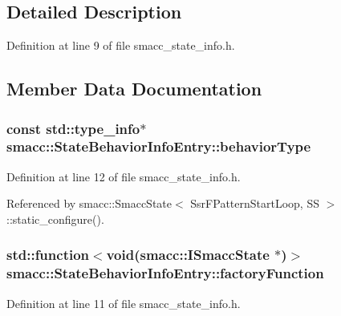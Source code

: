 \subsection{Detailed Description}


Definition at line 9 of file smacc\+\_\+state\+\_\+info.\+h.



\subsection{Member Data Documentation}
\subsubsection[{\texorpdfstring{behavior\+Type}{behaviorType}}]{\setlength{\rightskip}{0pt plus 5cm}const std\+::type\+\_\+info$\ast$ smacc\+::\+State\+Behavior\+Info\+Entry\+::behavior\+Type}\hypertarget{structsmacc_1_1StateBehaviorInfoEntry_a9f77a396b80171e010b3c30778b2f3f0}{}\label{structsmacc_1_1StateBehaviorInfoEntry_a9f77a396b80171e010b3c30778b2f3f0}


Definition at line 12 of file smacc\+\_\+state\+\_\+info.\+h.



Referenced by smacc\+::\+Smacc\+State$<$ Ssr\+F\+Pattern\+Start\+Loop, S\+S $>$\+::static\+\_\+configure().

\subsubsection[{\texorpdfstring{factory\+Function}{factoryFunction}}]{\setlength{\rightskip}{0pt plus 5cm}std\+::function$<$void({\bf smacc\+::\+I\+Smacc\+State} $\ast$)$>$ smacc\+::\+State\+Behavior\+Info\+Entry\+::factory\+Function}\hypertarget{structsmacc_1_1StateBehaviorInfoEntry_a0af2d6aabb921c95fd723b554cc21aa9}{}\label{structsmacc_1_1StateBehaviorInfoEntry_a0af2d6aabb921c95fd723b554cc21aa9}


Definition at line 11 of file smacc\+\_\+state\+\_\+info.\+h.



